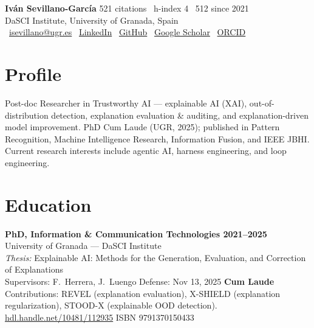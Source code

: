 \documentclass[10pt,a4paper]{article}
\newcommand{\blueitem}[1]{\textcolor{subtitleblue}{\textbf{#1}}}
\newcommand{\sub}[1]{\textcolor{subtle}{\footnotesize #1}}
\begin{document}
{\Large \textbf{\textcolor{titleblue}{Iván Sevillano-García}}} \hfill {\footnotesize \textcolor{subtle}{521 citations \textbar\ h-index 4 \textbar\ 512 since 2021}} \\[0.1em]
{\footnotesize DaSCI Institute, University of Granada, Spain} \\[0.1em]
{\footnotesize
\faEnvelope\ \href{mailto:isevillano@ugr.es}{isevillano@ugr.es} \quad
\faGlobe\ \href{https://www.linkedin.com/in/iván-sevillano-garcía-304801116}{LinkedIn} \quad
\faGithub\ \href{https://github.com/isega24}{GitHub} \quad
\faGraduationCap\ \href{https://scholar.google.com/citations?user=g5xyauEAAAAJ}{Google Scholar} \quad
\faOrcid\ \href{https://orcid.org/0000-0002-5029-9106}{ORCID}
}

\vspace{0.3em}

\section*{Profile}

Post-doc Researcher in Trustworthy AI --- explainable AI (XAI), out-of-distribution detection, explanation evaluation \& auditing, and explanation-driven model improvement. PhD Cum Laude (UGR, 2025); published in Pattern Recognition, Machine Intelligence Research, Information Fusion, and IEEE JBHI. Current research interests include agentic AI, harness engineering, and loop engineering.

\section*{Education}

\blueitem{PhD, Information \& Communication Technologies \hfill 2021--2025} \\
\sub{University of Granada --- DaSCI Institute} \\
\textit{Thesis:} Explainable AI: Methods for the Generation, Evaluation, and Correction of Explanations \\
\sub{Supervisors: F.~Herrera, J.~Luengo \quad Defense: Nov 13, 2025 \quad \textbf{Cum Laude}} \\
\sub{Contributions: REVEL (explanation evaluation), X-SHIELD (explanation regularization), STOOD-X (explainable OOD detection). \href{https://hdl.handle.net/10481/112935}{hdl.handle.net/10481/112935} \quad ISBN 9791370150433}

\vspace{0.2em}
\end{document}
